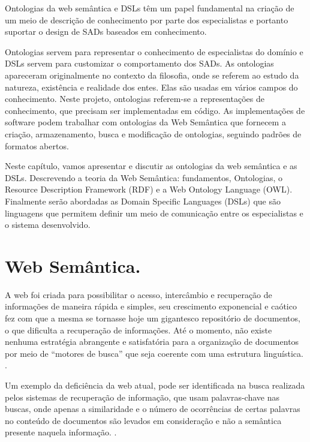 Ontologias da web semântica e \foreignlanguage{english}{DSLs} têm
um papel fundamental na criação de um meio de descrição de conhecimento
por parte dos especialistas e portanto suportar o design  de SADs
baseados em conhecimento. 

Ontologias servem para representar o conhecimento de especialistas
do domínio e DSLs servem para customizar o comportamento dos SADs.
As ontologias apareceram originalmente no contexto da filosofia, onde
se referem ao estudo da natureza, existência e realidade dos entes.
Elas são usadas em vários campos do conhecimento. Neste projeto, ontologias
referem-se a representações de conhecimento, que precisam ser implementadas
em código. As implementações de software podem trabalhar com ontologias
da Web Semântica que fornecem a criação, armazenamento, busca e modificação
de ontologias, seguindo padrões de formatos abertos. 

Neste capítulo, vamos apresentar e discutir as ontologias da web semântica
e as DSLs. Descrevendo a teoria da Web Semântica: fundamentos, Ontologias,
o \foreignlanguage{english}{Resource Description Framework (RDF})
e a \foreignlanguage{english}{Web Ontology Language} (\foreignlanguage{english}{OWL}).
Finalmente serão abordadas as \foreignlanguage{english}{Domain Specific
Languages (DSLs}) que são linguagens que permitem definir um meio
de comunicação entre os especialistas e o sistema desenvolvido.

\section{Web Semântica.}

A web foi criada para possibilitar o acesso, intercâmbio e recuperação
de informações de maneira rápida e simples, seu crescimento exponencial
e caótico fez com que a mesma se tornasse hoje um gigantesco repositório
de documentos, o que dificulta a recuperação de informações. Até o
momento, não existe nenhuma estratégia abrangente e satisfatória para
a organização de documentos por meio de “motores de busca” que seja
coerente com uma estrutura linguística. \citep{Souza:2004}.

Um exemplo da deficiência da web atual, pode ser identificada na busca
realizada pelos sistemas de recuperação de informação, que usam palavras-chave
nas buscas, onde apenas a similaridade e o número de ocorrências de
certas palavras no conteúdo de documentos são levados em consideração
e não a semântica presente naquela informação. \citep{Souza:2004}.

